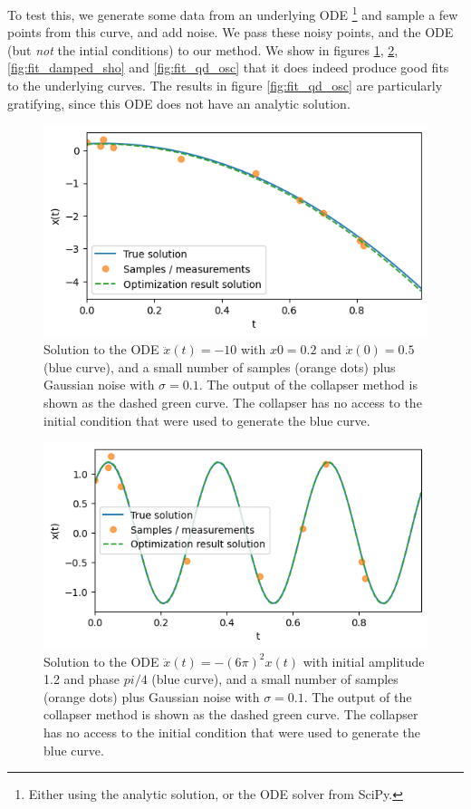 \documentclass{article}
\begin{document}
To test this, we generate some data from an underlying ODE%
\footnote{
Either using the analytic solution, or the ODE solver from SciPy.
}
and sample a few points from this curve, and add noise.
We pass these noisy points, and the ODE (but \emph{not} the intial conditions) to our method.
We show in figures \ref{fig:fit_const_acc}, \ref{fig:fit_sho}, \ref{fig:fit_damped_sho} and \ref{fig:fit_qd_osc} that it does indeed produce good fits to the underlying curves.
The results in figure \ref{fig:fit_qd_osc} are particularly gratifying, since this ODE does not have an analytic solution.

\begin{figure}
\includegraphics{images/results/fit_const_acc.png}
\centering
\caption{
Solution to the ODE $\ddot{x}(t) = -10$ with $x{0} = 0.2$ and $\dot{x}(0) = 0.5$ (blue curve), and a small number of samples (orange dots) plus Gaussian noise with $\sigma = 0.1$.
The output of the collapser method is shown as the dashed green curve.
The collapser has no access to the initial condition that were used to generate the blue curve.
}
\label{fig:fit_const_acc}
\end{figure}

\begin{figure}
\includegraphics{images/results/fit_sho.png}
\centering
\caption{
Solution to the ODE $\ddot{x}(t) = - (6\pi)^2 x(t)$ with initial amplitude 1.2 and phase $pi/4$ (blue curve), and a small number of samples (orange dots) plus Gaussian noise with $\sigma = 0.1$.
The output of the collapser method is shown as the dashed green curve.
The collapser has no access to the initial condition that were used to generate the blue curve.
}
\label{fig:fit_sho}
\end{figure}
\end{document}
